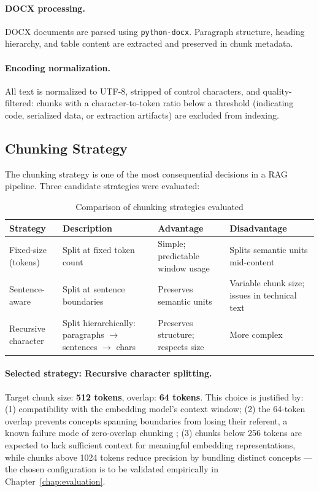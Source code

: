 \paragraph{DOCX processing.} DOCX documents are parsed using \texttt{python-docx}. Paragraph structure, heading hierarchy, and table content are extracted and preserved in chunk metadata.

\paragraph{Encoding normalization.} All text is normalized to UTF-8, stripped of control characters, and quality-filtered: chunks with a character-to-token ratio below a threshold (indicating code, serialized data, or extraction artifacts) are excluded from indexing.

\subsection{Chunking Strategy}
\label{subsec:chunking}

The chunking strategy is one of the most consequential decisions in a RAG pipeline. Three candidate strategies were evaluated:

\begin{table}[H]
\centering
\caption{Comparison of chunking strategies evaluated}
\label{tab:chunking-strategies}
\begin{tabularx}{\textwidth}{@{}lXXX@{}}
\toprule
\textbf{Strategy} & \textbf{Description} & \textbf{Advantage} & \textbf{Disadvantage} \\
\midrule
Fixed-size (tokens) & Split at fixed token count & Simple; predictable window usage & Splits semantic units mid-content \\
Sentence-aware & Split at sentence boundaries & Preserves semantic units & Variable chunk size; issues in technical text \\
Recursive character & Split hierarchically: paragraphs $\to$ sentences $\to$ chars & Preserves structure; respects size & More complex \\
\bottomrule
\end{tabularx}
\end{table}

\paragraph{Selected strategy: Recursive character splitting.} Target chunk size: \textbf{512 tokens}, overlap: \textbf{64 tokens}. This choice is justified by: (1) compatibility with the embedding model's context window; (2) the 64-token overlap prevents concepts spanning boundaries from losing their referent, a known failure mode of zero-overlap chunking \citep{Gao2024}; (3) chunks below 256 tokens are expected to lack sufficient context for meaningful embedding representations, while chunks above 1024 tokens reduce precision by bundling distinct concepts --- the chosen configuration is to be validated empirically in Chapter~\ref{chap:evaluation}.

